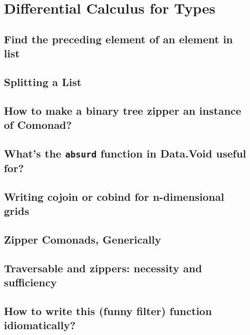 \documentclass{book}
\begin{document}
\chapter{Differential Calculus for Types}

\section{Find the preceding element of an element in list}


\section{Splitting a List}


\section{How to make a binary tree zipper an instance of Comonad?}


\section{What's the {\tt absurd} function in Data.Void useful for?}


\section{Writing cojoin or cobind for n-dimensional grids}


\section{Zipper Comonads, Generically}


\section{Traversable and zippers: necessity and sufficiency}


\section{How to write this (funny filter) function idiomatically?}

\end{document}
